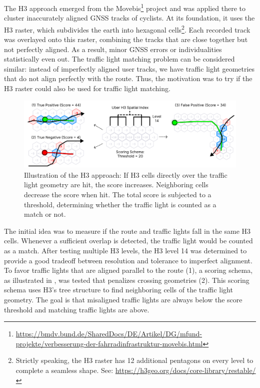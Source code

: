 The H3 approach emerged from the Movebis\footnote{\url{https://bmdv.bund.de/SharedDocs/DE/Artikel/DG/mfund-projekte/verbesserung-der-fahrradinfrastruktur-movebis.html}} project and was applied there to cluster inaccurately aligned GNSS tracks of cyclists. At its foundation, it uses the H3 raster, which subdivides the earth into hexagonal cells\footnote{Strictly speaking, the H3 raster has 12 additional pentagons on every level to complete a seamless shape. See: \url{https://h3geo.org/docs/core-library/restable/}}. Each recorded track was overlayed onto this raster, combining the tracks that are close together but not perfectly aligned. As a result, minor GNSS errors or individualities statistically even out. The traffic light matching problem can be considered similar: instead of imperfectly aligned user tracks, we have traffic light geometries that do not align perfectly with the route. Thus, the motivation was to try if the H3 raster could also be used for traffic light matching.

\begin{figure}[t]
\centering
\includegraphics[width=\linewidth]{images/sg-selection-h3-approach.pdf}
\caption{Illustration of the H3 approach: If H3 cells directly over the traffic light geometry are hit, the score increases. Neighboring cells decrease the score when hit. The total score is subjected to a threshold, determining whether the traffic light is counted as a match or not.}
\label{fig:sg-selection-h3-approach}
\end{figure}

The initial idea was to measure if the route and traffic lights fall in the same H3 cells. Whenever a sufficient overlap is detected, the traffic light would be counted as a match. After testing multiple H3 levels, the H3 level 14 was determined to provide a good tradeoff between resolution and tolerance to imperfect alignment. To favor traffic lights that are aligned parallel to the route (1), a scoring schema, as illustrated in , was tested that penalizes crossing geometries (2). This scoring schema uses H3's tree structure to find neighboring cells of the traffic light geometry. The goal is that misaligned traffic lights are always below the score threshold and matching traffic lights are above.

